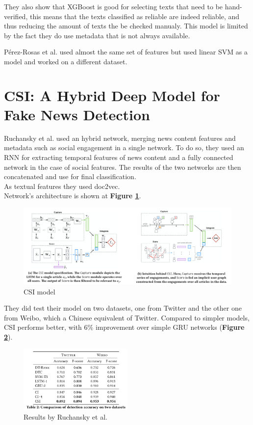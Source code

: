 They also show that XGBoost is good for selecting texts that need to be hand-verified, this means that the texts classified as reliable are indeed reliable, and thus reducing the amount of texts the be checked manualy. This model is limited by the fact they do use metadata that is not always available. 

P\'erez-Rosas et al.\cite{Perez-Rosas2017} used almost the same set of features but used linear SVM as a model and worked on a different dataset.

\section{CSI: A Hybrid Deep Model for Fake News Detection}
Ruchansky et al.\cite{Ruchansky2017} used an hybrid network, merging news content features and metadata such as social engagement in a single network. To do so, they used an RNN for extracting temporal features of news content and a fully connected network in the case of social features. The results of the two networks are then concatenated and use for final classification. \\

As textual features they used doc2vec\cite{Le2014}. \\

Network's architecture is shown at \textbf{Figure \ref{fig:chap1:Ruchansky}}.

\begin{figure}[h]
 \centering
 \includegraphics[width=\textwidth]{images/chap1_bis/rev2.png}
 \caption{CSI model}
 \label{fig:chap1:Ruchansky}
\end{figure}

They did test their model on two datasets, one from Twitter and the other one from Weibo, which a Chinese equivalent of Twitter. Compared to simpler models, CSI performs better, with $6\%$ improvement over simple GRU networks (\textbf{Figure \ref{fig:chap1:Ruchansky2}}). 

\begin{figure}[h]
 \centering
 \includegraphics[width=0.5\textwidth]{images/chap1_bis/rev3.png}
 \caption{Results by Ruchansky et al. }
 \label{fig:chap1:Ruchansky2}
\end{figure}

